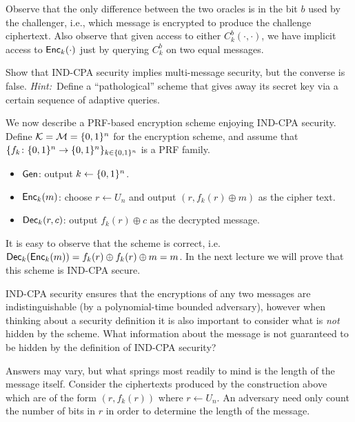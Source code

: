\documentclass[11pt]{article}
\begin{document}
Observe that the only difference between the two oracles is in the bit
$b$ used by the challenger, i.e., which message is encrypted to
produce the challenge ciphertext.  Also observe that given access to
either $C^{b}_{k}(\cdot,\cdot)$, we have implicit access to
$\mathsf{Enc}_{k}(\cdot)$ just by querying $C^{b}_{k}$ on two equal
messages.

\begin{question}
  Show that IND-CPA security implies multi-message security, but the
  converse is false.  \textit{Hint:}~Define a ``pathological'' scheme
  that gives away its secret key via a certain sequence of adaptive
  queries.
\end{question}

We now describe a PRF-based encryption scheme enjoying IND-CPA
security.  Define $\mathcal{K} = \mathcal{M} = \{0,1\}^{n}$ for the
encryption scheme, and assume that $\{f_{k} \colon \{0,1\}^{n} \to
  \{0,1\}^{n}\}_{k \in \{0,1\}^{n}}$ is a PRF family.
\begin{itemize}
\item $\mathsf{Gen}$: output $k \gets \{0,1\}^n$.
\item $\mathsf{Enc}_k(m)$: choose $r \gets U_n$ and output $(r, f_k(r)
  \oplus m)$ as the cipher text.
\item $\mathsf{Dec}_k(r,c)$: output $f_k(r) \oplus c$ as the decrypted
  message.
\end{itemize}

It is easy to observe that the scheme is correct,
i.e. $\mathsf{Dec}_k(\mathsf{Enc}_k (m)) = f_k(r) \oplus f_k(r) \oplus m =
m$. In the next lecture we will prove that this scheme is IND-CPA
secure.

\begin{question}
  IND-CPA security ensures that the encryptions of any two messages
  are indistinguishable (by a polynomial-time bounded adversary),
  however when thinking about a security definition it is also
  important to consider what is \emph{not} hidden by the scheme. What
  information about the message is not guaranteed to be hidden by the
  definition of IND-CPA security?
\end{question}

\begin{answer}
  Answers may vary, but what springs most readily to mind is the
  length of the message itself. Consider the ciphertexts produced by
  the construction above which are of the form \((r, f_k(r))\) where
  \(r \gets U_n\). An adversary need only count the number of bits in
  \(r\) in order to determine the length of the message.
\end{answer}
\end{document}
